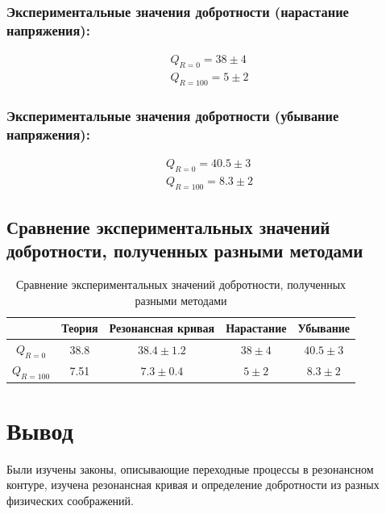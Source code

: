 \documentclass{letnab}
\begin{document}
\subsubsection*{Экспериментальные значения добротности (нарастание напряжения):}
\begin{gather*}
Q_{R=0} = 38 \pm 4 \\
Q_{R=100} = 5 \pm 2
\end{gather*}

\subsubsection*{Экспериментальные значения добротности (убывание напряжения):}
\begin{gather*}
Q_{R=0} = 40.5 \pm 3 \\
Q_{R=100} = 8.3 \pm 2
\end{gather*}

\subsection*{Сравнение экспериментальных значений добротности, полученных разными методами}

\begin{table}[H]
\centering
\begin{tabular}{|c|c|c|c|c|}
\hline
            & Теория & Резонансная кривая & Нарастание & Убывание     \\ \hline
$Q_{R=0}$   & 38.8   & $38.4 \pm 1.2$     & $38 \pm 4$ & $40.5 \pm 3$ \\ \hline
$Q_{R=100}$ & 7.51   & $7.3 \pm 0.4$      & $5 \pm 2$  & $8.3 \pm 2$  \\ \hline
\end{tabular}
\caption{Сравнение экспериментальных значений добротности, полученных разными методами}
\end{table}

\section{Вывод}
Были изучены законы, описывающие переходные процессы в резонансном контуре, изучена резонансная кривая и определение добротности из разных физических соображений.
\end{document}
